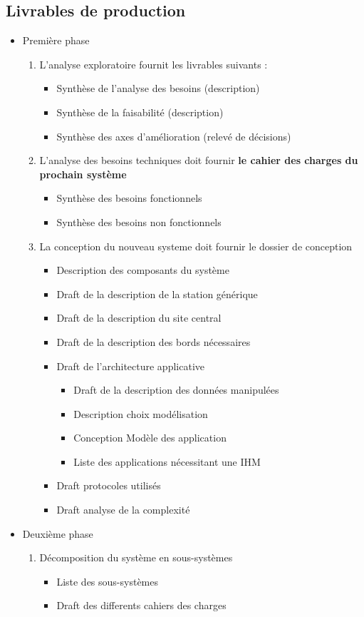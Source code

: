 \subsection{Livrables de production}
\begin{itemize}
\item Première phase
\begin{enumerate}
\item L'analyse exploratoire fournit les livrables suivants :
\begin{itemize}
\item Synthèse de l'analyse des besoins (description)
\item Synthèse de la faisabilité (description)
\item Synthèse des axes d'amélioration (relevé de décisions)
\end{itemize}
\item L'analyse des besoins techniques doit fournir \textbf{le cahier des charges du prochain système} 
\begin{itemize}       
\item Synthèse des besoins fonctionnels
\item Synthèse des besoins non fonctionnels       
\end{itemize}       
       
\item La conception du nouveau systeme doit fournir le dossier de conception 
\begin{itemize}
	   
\item Description des composants du système
\item Draft de la description de la station générique
\item Draft de la description du site central
\item Draft de la description des bords nécessaires
\item Draft de l'architecture applicative   
\begin{itemize}

\item Draft de la description des données manipulées
\item Description choix modélisation      
\item Conception Modèle des application
\item Liste des applications nécessitant une IHM          
\end{itemize}          
\item Draft protocoles utilisés
\item Draft analyse de la complexité
\end{itemize}       
\end{enumerate} 
\item Deuxième phase
\begin{enumerate}
\item Décomposition du système en sous-systèmes 
\begin{itemize}
\item Liste des sous-systèmes 
\item Draft des differents cahiers des charges
\end{itemize}     
     


\end{enumerate}
\end{itemize}
